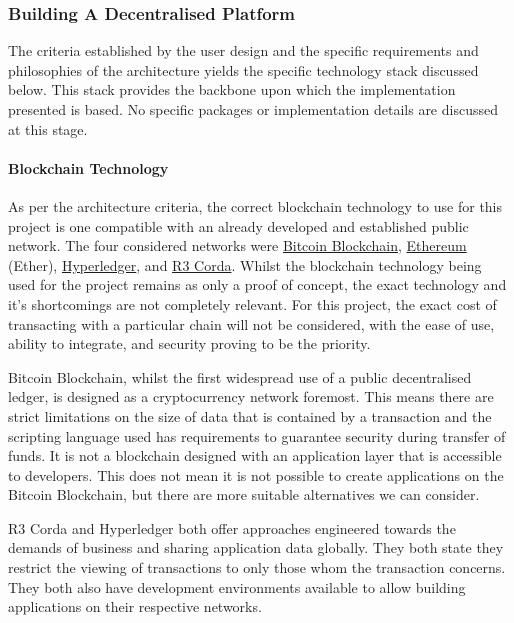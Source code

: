 \subsubsection{Building A Decentralised Platform}

The criteria established by the user design and the specific requirements and philosophies of the architecture yields the specific technology stack discussed below. This stack provides the backbone upon which the implementation presented is based. No specific packages or implementation details are discussed at this stage.

\paragraph{Blockchain Technology}

As per the architecture criteria, the correct blockchain technology to use for this project is one compatible with an already developed and established public network. The four considered networks were \href{https://bitcoin.org/en/}{Bitcoin Blockchain}, \href{https://www.ethereum.org/}{Ethereum} (Ether), \href{https://www.hyperledger.org/}{Hyperledger}, and \href{https://www.corda.net/}{R3 Corda}. Whilst the blockchain technology being used for the project remains as only a proof of concept, the exact technology and it's shortcomings are not completely relevant. For this project, the exact cost of transacting with a particular chain will not be considered, with the ease of use, ability to integrate, and security proving to be the priority.

Bitcoin Blockchain, whilst the first widespread use of a public decentralised ledger, is designed as a cryptocurrency network foremost. This means there are strict limitations on the size of data that is contained by a transaction and the scripting language used has requirements to guarantee security during transfer of funds. It is not a blockchain designed with an application layer that is accessible to developers. This does not mean it is not possible to create applications on the Bitcoin Blockchain, but there are more suitable alternatives we can consider.

R3 Corda and Hyperledger both offer approaches engineered towards the demands of business and sharing application data globally. They both state they restrict the viewing of transactions to only those whom the transaction concerns. They both also have development environments available to allow building applications on their respective networks. 

